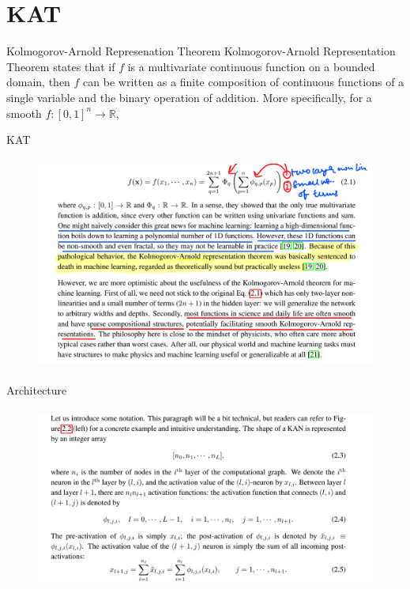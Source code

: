 \documentclass[serif, aspectratio=169]{beamer}
\begin{document}
\section{KAT}
\begin{frame}{Kolmogorov-Arnold Represenation Theorem}
    Kolmogorov-Arnold Representation Theorem states that if $f$ is a multivariate continuous function
    on a bounded domain, then $f$ can be written as a finite composition of continuous functions of a
    single variable and the binary operation of addition. More specifically, for a smooth $f : [0, 1]^n \to \mathbb{R}$,
\end{frame}
\begin{frame}{KAT}
    \begin{figure}
        \centering
        \includegraphics[height=7cm]{image copy 10.png}
    \end{figure}
\end{frame}
\begin{frame}{Architecture}
    \begin{figure}
        \centering
        \includegraphics[height=6cm]{image copy 11.png}
    \end{figure}
\end{frame}
\end{document}
